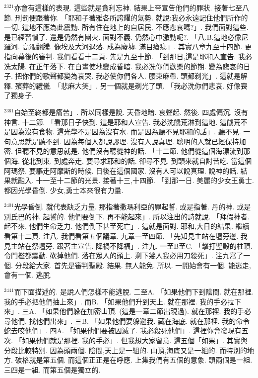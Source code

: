 \documentclass{book}
\begin{document}
$^{2321}$亦會有這樣的表現.
這些就是貪利忘神.
結果上帝宣告他們的罪狀.
接著七至八節.
刑罰便跟著你.
「耶和子著雅各所誇耀的氣勢.
就說:我必永遠記住他們所作的一切.
這地不應為此震動.
所有住在地上的自居民.
不應悲哀嗎?」.
我們面對這些.
是已經習慣了.
還是仍然有團火.
面對不義.
仍然心中激動呢?.
「八.B.這地必像尼羅河.
高漲翻騰.
像埃及大河退落.
成為廢墟.
滿目瘡痍」.
其實八章九至十四節.
更指向幕後的審判.
我們看看十二頁.
先是九至十節.
「到那日,這是耶和人宣告.
我必洗太陽.
在正午落下.
在白晝使地變成昏暗.
我必洗你們歡樂的節期.
變為悲哀的日子.
把你們的歌聲都變為哀哭.
我必使你們各人.
腰束麻帶.
頭都剃光」.
這就是解釋.
殯葬的禮儀.
「悲麻大笑」.
另一個就是剃光了頭.
「我必洗你們悲哀.
好像喪了獨身子.

$^{2361}$自始至終都是痛苦」.
所以同樣是說.
天昏地暗.
哀聲起.
然後.
四處偏沉.
沒有神言.
十二節.
「看那日子快到.
這是耶和人宣告.
我必洗饑荒淋到這地.
這饑荒不是因為沒有食物.
這光學不是因為沒有水.
而是因為聽不見耶和的話」.
聽不見.
一句意思就是聽不到.
因為每個人都說謬理.
沒有人說真理.
聰明的人就已經保持加密.
但聽不見的意思就是.
他們沒有聽從神的話.
「十二節.
他們從這個海漂流到那個海.
從北到東.
到處奔走.
要尋求耶和的話.
卻尋不見.
到頭來就自討苦吃.
當這個阿瑪祭.
要驅走阿摩斯的時候.
日後在這個國家.
沒有人可以說真理.
說神的話.
結果就融入.
十一至十二節的光景.
接著十三,十四節.
「到那一日.
美麗的少女王勇士.
都因光學昏倒.
少女,勇士本來很有力量.

$^{2401}$光學昏倒.
就代表缺乏力量.
那指著撒瑪利亞的罪起誓.
或是指著.
丹的神.
或是別氏巴的神.
起誓的.
他們要倒下.
再不能起來」.
所以注出的詩就說.
「拜假神者.
起不來.
他們生命乏力.
他們倒下甚至死亡」.
這就是面對.
耶和,大日的結果.
繼續看第十二頁.
注八.
我們看第五個議章.
九章一至四節.
「先知見主站在壇旁邊.
我見主站在祭壇旁.
跟著主宣告.
降禍不降福」.
注九.
一至B至C.
「擊打聖殿的柱頂.
令門檻都震動.
砍掉他們.
落在眾人的頭上.
剩下幾人我必用刀殺死」.
注九寫了一個.
分段給大家.
首先是審判聖殿.
結果.
無人能免.
所以.
一開始會有一個.
能逃走,會有一個.
逃脫.

$^{2441}$而下面描述的.
是說人們怎樣不能逃脫.
二至A.
「如果他們下到陰間.
就在那裡.
我的手必把他們抽上來」.
而B.
「如果他們升到天上.
就在那裡.
我的手必拉下來」.
三A.
「如果他們躲在加密山頂.
(這是一章二節出現過).
就在那裡.
我的手必尋他們.
找他們出來」.
三B.
「如果他們要躲避我.
藏在海底.
就在那裡.
我的命令蛇去咬他們」.
四A.
「如果他們要被囚滅了.
我必殺死他們」.
這裡你會發現有五次.
「如果他們就是那裡.
我的手必」.
但我想大家留意.
這五個「如果」.
其實與分段比較特別.
因為頭兩個.
陰間,天上是一組的.
山頂,海底又是一組的.
而特別的地方.
破格就是第五個.
而這個正正是在呼應.
上集我們有五個的意象.
頭兩個是一組.
三四是一組.
而第五個是獨立的.
\end{document}
